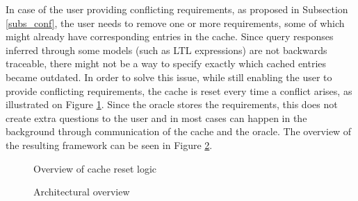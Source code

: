 In case of the user providing conflicting requirements, as proposed in Subsection \ref{subs_conf}, the user needs to remove one or more requirements, some of which might already have corresponding entries in the cache. Since query responses inferred through some models (such as LTL expressions) are not backwards traceable, there might not be a way to specify exactly which cached entries became outdated. In order to solve this issue, while still enabling the user to provide conflicting requirements, the cache is reset every time a conflict arises, as illustrated on Figure \ref{fig_architcture_ileoverview_cache}. Since the oracle stores the requirements, this does not create extra questions to the user and in most cases can happen in the background through communication of the cache and the oracle. The overview of the resulting framework can be seen in Figure \ref{fig_architcture_informaloverview_complete}.

\begin{figure}[!ht] 
	\centering
	\caption{Overview of cache reset logic} 
	\label{fig_architcture_ileoverview_cache}
\end{figure}



\begin{figure}[!ht] 
	\centering
	\caption{Architectural overview}
	\label{fig_architcture_informaloverview_complete}
\end{figure}



